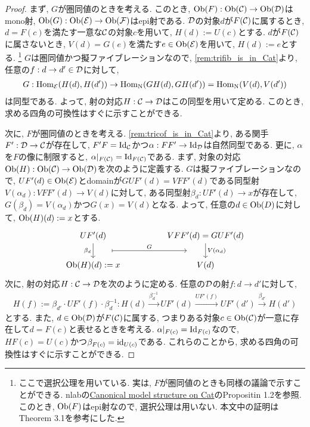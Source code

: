 \documentclass[uplatex, a4paper, 14Q, dvipdfmx]{jsarticle}
\begin{document}
\begin{proof}
  まず, $G$が圏同値のときを考える. 
  このとき, $\mathrm{Ob}(F) : \mathrm{Ob}(\mathcal{C}) \to \mathrm{Ob}(\mathcal{D})$はmono射, $\mathrm{Ob}(G) : \mathrm{Ob}(\mathcal{E}) \to \mathrm{Ob}(\mathcal{F})$はepi射である. 
  $\mathcal{D}$の対象$d$が$F(\mathcal{C})$に属するとき, $d=F(c)$を満たす一意な$\mathcal{C}$の対象$c$を用いて, $H(d) := U(c)$とする. 
  $d$が$F(\mathcal{C})$に属さないとき, $V(d)=G(e)$を満たす$e \in \mathrm{Ob}(\mathcal{E})$を用いて, $H(d):=e$とする.
  \footnote{
    ここで選択公理を用いている.
    実は, $F$が圏同値のときも同様の議論で示すことができる. 
    nlabの\href{https://ncatlab.org/nlab/show/canonical+model+structure+on+Cat}{Canonical model structure on Cat}のPropositin 1.2を参照. 
    このとき, $\mathrm{Ob}(F)$はepi射なので, 選択公理は用いない. 
    本文中の証明は\cite{Rezk96} Theorem 3.1を参考にした. 
  }
  $G$は圏同値かつ擬ファイブレーションなので, \cref{rem:trifib_is_in_Cat}より, 任意の$f : d \to d' \in \mathcal{D}$に対して, 
  \begin{align*}
    G : \mathrm{Hom}_{\mathcal{E}}(H(d),H(d')) \to  \mathrm{Hom}_{\mathrm{N}}(GH(d),GH(d')) = \mathrm{Hom}_{\mathrm{N}}(V(d),V(d'))
  \end{align*}
  は同型である. 
  よって, 射の対応$H : \mathcal{C} \to \mathcal{D}$はこの同型を用いて定める. 
  このとき, 求める四角の可換性はすぐに示すことができる. 

  次に, $F$が圏同値のときを考える. 
  \cref{rem:tricof_is_in_Cat}より, ある関手$F' : \mathcal{D} \to \mathcal{C}$が存在して, $F'F=\mathrm{Id}_{\mathcal{C}}$かつ$\alpha : FF' \to \mathrm{Id}_{\mathcal{D}}$は自然同型である. 
  更に, $\alpha$を$F$の像に制限すると, $\alpha|_{F(\mathcal{C})} = \mathrm{Id}_{F(\mathcal{C})}$である. 
  まず, 対象の対応$\mathrm{Ob}(H) : \mathrm{Ob}(\mathcal{C}) \to \mathrm{Ob}(\mathcal{D})$を次のように定義する.
  $G$は擬ファイブレーションなので, $UF'(d) \in \mathrm{Ob}(\mathcal{E})$とdomainが$GUF'(d) = VFF'(d)$である同型射$V(\alpha_d) : VFF'(d) \to V(d)$に対して, ある同型射$\beta_d : UF'(d) \to x$が存在して, $G(\beta_d) = V(\alpha_d)$かつ$G(x) = V(d)$となる. 
  よって, 任意の$d \in \mathrm{Ob}(D)$に対して, $\mathrm{Ob}(H)(d) := x$とする. 
  \[\begin{tikzcd}
    {UF'(d)} && {VFF'(d)=GUF'(d)} \\
    {\Ob(H)(d) :=x} && {V(d)}
    \arrow[""{name=0, anchor=center, inner sep=0}, "{\beta_d}"', from=1-1, to=2-1]
    \arrow[""{name=1, anchor=center, inner sep=0}, "{V(\alpha_d)}", from=1-3, to=2-3]
    \arrow["G", shorten <=22pt, shorten >=22pt, maps to, from=0, to=1]
  \end{tikzcd}\]
  次に, 射の対応$H : \mathcal{C} \to \mathcal{D}$を次のように定める. 
  任意の$\mathcal{D}$の射$f : d \to d'$に対して, 
  \begin{align*}
    H(f) := \beta_{d'} \cdot UF'(f) \cdot \beta_d^{-1} : H(d) \xrightarrow{\beta_d^{-1}} UF'(d) \xrightarrow{UF'(f)} UF'(d') \xrightarrow{\beta_{d'}} H(d')
  \end{align*}
  とする. 
  また, $d \in \mathrm{Ob}(\mathcal{D})$が$F(\mathcal{C})$に属する, つまりある対象$c \in \mathrm{Ob}(\mathcal{C})$が一意に存在して$d=F(c)$と表せるときを考える. 
  $\alpha|_{F(c)} = \mathrm{Id}_{F(c)}$なので, $HF(c) = U(c)$かつ$\beta_{F(c)} = \mathrm{id}_{U(c)}$である. 
  これらのことから, 求める四角の可換性はすぐに示すことができる. 
\end{proof}
\end{document}
